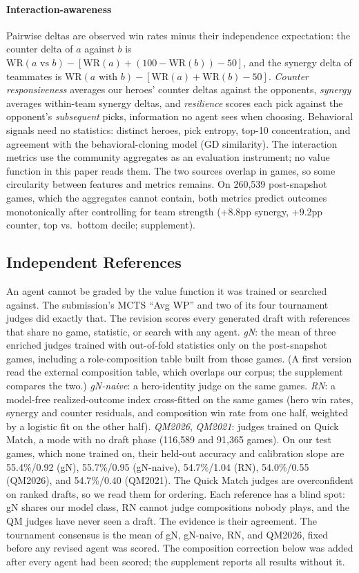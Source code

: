 \documentclass[journal]{IEEEtran}
\begin{document}
\paragraph{Interaction-awareness} Pairwise deltas are observed win rates minus their independence expectation: the counter delta of $a$ against $b$ is $\mathrm{WR}(a\text{ vs }b) - [\mathrm{WR}(a) + (100 - \mathrm{WR}(b)) - 50]$, and the synergy delta of teammates is $\mathrm{WR}(a\text{ with }b) - [\mathrm{WR}(a) + \mathrm{WR}(b) - 50]$. \textit{Counter responsiveness} averages our heroes' counter deltas against the opponents, \textit{synergy} averages within-team synergy deltas, and \textit{resilience} scores each pick against the opponent's \textit{subsequent} picks, information no agent sees when choosing. Behavioral signals need no statistics: distinct heroes, pick entropy, top-10 concentration, and agreement with the behavioral-cloning model (GD similarity). The interaction metrics use the community aggregates as an evaluation instrument; no value function in this paper reads them. The two sources overlap in games, so some circularity between features and metrics remains. On 260,539 post-snapshot games, which the aggregates cannot contain, both metrics predict outcomes monotonically after controlling for team strength (+8.8pp synergy, +9.2pp counter, top vs.\ bottom decile; supplement).

\subsection{Independent References}
\label{sec:refs}

An agent cannot be graded by the value function it was trained or searched against. The submission's MCTS ``Avg WP'' and two of its four tournament judges did exactly that. The revision scores every generated draft with references that share no game, statistic, or search with any agent. \textit{gN}: the mean of three enriched judges trained with out-of-fold statistics only on the post-snapshot games, including a role-composition table built from those games. (A first version read the external composition table, which overlaps our corpus; the supplement compares the two.) \textit{gN-naive}: a hero-identity judge on the same games. \textit{RN}: a model-free realized-outcome index cross-fitted on the same games (hero win rates, synergy and counter residuals, and composition win rate from one half, weighted by a logistic fit on the other half). \textit{QM2026}, \textit{QM2021}: judges trained on Quick Match, a mode with no draft phase (116,589 and 91,365 games). On our test games, which none trained on, their held-out accuracy and calibration slope are 55.4\%/0.92 (gN), 55.7\%/0.95 (gN-naive), 54.7\%/1.04 (RN), 54.0\%/0.55 (QM2026), and 54.7\%/0.40 (QM2021). The Quick Match judges are overconfident on ranked drafts, so we read them for ordering. Each reference has a blind spot: gN shares our model class, RN cannot judge compositions nobody plays, and the QM judges have never seen a draft. The evidence is their agreement. The tournament consensus is the mean of gN, gN-naive, RN, and QM2026, fixed before any revised agent was scored. The composition correction below was added after every agent had been scored; the supplement reports all results without it.
\end{document}

